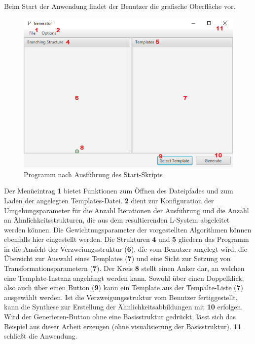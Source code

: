Beim Start der Anwendung findet der Benutzer die grafische Oberfläche vor.
\begin{figure}[H]
    \centering
    \includegraphics[width=14cm]{../images/UI_numbers1.png}
    \caption{Programm nach Ausführung des Start-Skripts}
\end{figure}
Der Menüeintrag \textbf{1} bietet Funktionen zum Öffnen des Dateipfades und zum Laden der angelegten Templates-Datei.
\textbf{2} dient zur Konfiguration der Umgebungsparameter für die Anzahl Iterationen der Ausführung
und die Anzahl an Ähnlichkeitsstrukturen, die aus dem resultierenden L-System abgeleitet werden können.
Die Gewichtungsparameter der vorgestellten Algorithmen können ebenfalls hier eingestellt werden.
Die Strukturen \textbf{4} und \textbf{5} gliedern das Programm in die Ansicht der Verzweiungsstruktur (\textbf{6}), die vom Benutzer
angelegt wird, die Übersicht zur Auswahl eines Templates (\textbf{7}) und eine Sicht zur Setzung von Transformationsparametern (\textbf{7}).
Der Kreis \textbf{8} stellt einen Anker dar, an welchen eine Template-Instanz angehängt werden kann.
Sowohl über einen Doppelklick, also auch über einen Button (\textbf{9}) kann ein Template aus der Tempalte-Liste (\textbf{7})
ausgewählt werden.
Ist die Verzweigungsstruktur vom Benutzer fertiggestellt, kann die Synthese zur Erstellung der Ähnlichkeitsabbildungen
mit \textbf{10} erfolgen.
Wird der Generieren-Button ohne eine Basisstruktur gedrückt, lässt sich das Beispiel aus
dieser Arbeit erzeugen (ohne visualisierung der Basisstruktur).
\textbf{11} schließt die Anwendung.

